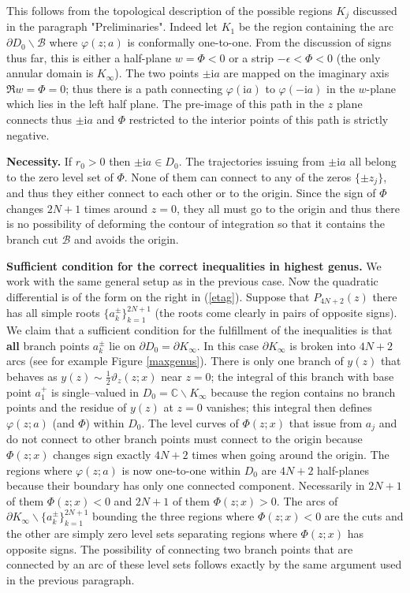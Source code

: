 \documentclass[10pt,reqno,oneside]{amsart}
\newcommand{\im}{\mathrm{i}}
\numberwithin{equation}{section}
\def \pa{\partial}
\def\C{{\mathbb C}}
\def\eqref#1{(\ref{#1})}
\begin{document}
This follows from the topological description of the possible regions $K_j$ discussed in the paragraph "Preliminaries". Indeed let $K_1$ be the region containing the arc $\pa D_0\backslash\mathcal B$ where $\varphi(z;a)$ is conformally one-to-one. From the discussion of signs thus far, this is either a half-plane $w = \Phi  <0$ or a strip $-\epsilon< \Phi  <0$ (the only annular domain is $K_\infty$). The two points $\pm\im a$ are mapped on the imaginary axis $\Re w = \Phi =0$; thus there is a path connecting $\varphi(\im a)$ to $\varphi(-\im a)$ in the $w$-plane which lies in the left half plane. The pre-image of this path in the $z$ plane connects thus $\pm\im a$ and $\Phi $ restricted to the interior points of this path is strictly negative.
\smallskip
 

 {\bf Necessity.} If $r_0>0$ then $\pm\im a\in D_0$. The trajectories issuing from $\pm\im a$ all belong to the zero level set of $\Phi$. None of them can connect to any of the zeros $\{\pm z_j\}$, and thus they either connect to each other or to the origin. 
 Since the sign of $\Phi $ changes $2N+1$ times around $z=0$, they all must go to the origin and thus there is no possibility of deforming the contour of integration so that it contains the branch cut $\mathcal B$ and avoids the origin.\smallskip
 
{\bf Sufficient condition for the correct inequalities in highest genus.}
 We work with the same general setup as in the previous case.
 Now the quadratic differential is of the form on the right in \eqref{etag}. Suppose that $P_{4N+2}(z)$ there has all simple roots $\{a_{k}^\pm\}_{k=1}^{2N+1}$ (the roots come clearly in pairs of opposite signs). We claim that a sufficient condition for the fulfillment of the inequalities  is that {\bf all} branch points $a_k^{\pm}$ lie on $\pa D_0 = \pa K_\infty$.
In this case $\pa K_\infty$ is broken into $4N+2$ arcs (see for example Figure \ref{maxgenus}). There is only one branch of $y(z)$ that behaves as $y(z)\sim\frac 12 \vartheta_z(z;x)$ near $z=0$; the integral of this branch with base point $a_1^+$ is single--valued in $D_0 = \C \backslash K_\infty$ because the region contains no branch points and the residue of $y(z)$ at $z=0$ vanishes; this integral then defines $\varphi(z;a)$ (and $\Phi$) within $D_0$. The level curves of $\Phi(z;x)$ that issue from $a_j$ and do not connect to other branch points must connect to the origin because $\Phi(z;x)$ changes sign exactly $4N+2$ times when going around the origin. The regions where $\varphi(z;a)$ is now one-to-one within $D_0$ are $4N+2$ half-planes because their boundary has only one connected component. Necessarily in $2N+1$ of them $\Phi(z;x)<0$ and $2N+1$ of them $\Phi(z;x) >0$. The arcs of $\pa K_{\infty} \backslash \{a_k^{\pm}\}_{k=1}^{2N+1}$ bounding the three regions where $\Phi(z;x)<0$ are the cuts and the other are simply zero level sets separating regions where $\Phi(z;x)$ has opposite signs. The possibility of connecting two branch points that are connected by an arc of these level sets follows exactly by the same argument used in the previous paragraph.\smallskip
\end{document}
